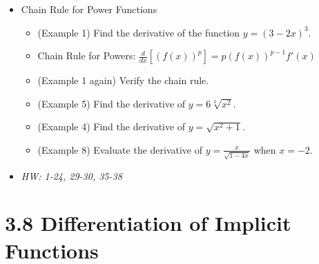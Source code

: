 \documentclass[11pt]{article}
\begin{document}
\begin{itemize}
\item Chain Rule for Power Functions
  \begin{itemize}
    \item (Example 1) Find the derivative of the function
          \(y=(3-2x)^3\).
    \item Chain Rule for Powers:
          \(\frac{d}{dx}[(f(x))^p]=p(f(x))^{p-1}f'(x)\)
    \item (Example 1 again) Verify the chain rule.
    \item (Example 5) Find the derivative of \(y=6\sqrt[3]{x^2}\).
    \item (Example 4) Find the derivative of \(y=\sqrt{x^2+1}\).
    \item (Example 8) Evaluate the derivative of \(y=\frac{x}{\sqrt{1-4x}}\)
          when \(x=-2\).
  \end{itemize}
\item\textit{
  HW: 1-24, 29-30, 35-38
}
\end{itemize}

\section*{3.8 Differentiation of Implicit Functions}
\end{document}
